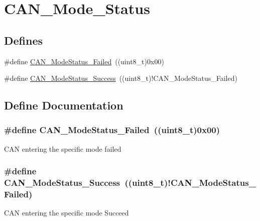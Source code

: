 \hypertarget{group__CAN__Mode__Status}{
\section{CAN\_\-Mode\_\-Status}
\label{group__CAN__Mode__Status}
}
\subsection*{Defines}
\begin{DoxyCompactItemize}
\item 
\#define \hyperlink{group__CAN__Mode__Status_ga9882944537945325ef08e1986838ea45}{CAN\_\-ModeStatus\_\-Failed}~((uint8\_\-t)0x00)
\item 
\#define \hyperlink{group__CAN__Mode__Status_ga7ca0ea503eb3b3a7c0abdfad27cb6579}{CAN\_\-ModeStatus\_\-Success}~((uint8\_\-t)!CAN\_\-ModeStatus\_\-Failed)
\end{DoxyCompactItemize}


\subsection{Define Documentation}
\hypertarget{group__CAN__Mode__Status_ga9882944537945325ef08e1986838ea45}{
\subsubsection[{CAN\_\-ModeStatus\_\-Failed}]{\setlength{\rightskip}{0pt plus 5cm}\#define CAN\_\-ModeStatus\_\-Failed~((uint8\_\-t)0x00)}}
\label{group__CAN__Mode__Status_ga9882944537945325ef08e1986838ea45}
CAN entering the specific mode failed \hypertarget{group__CAN__Mode__Status_ga7ca0ea503eb3b3a7c0abdfad27cb6579}{
\subsubsection[{CAN\_\-ModeStatus\_\-Success}]{\setlength{\rightskip}{0pt plus 5cm}\#define CAN\_\-ModeStatus\_\-Success~((uint8\_\-t)!CAN\_\-ModeStatus\_\-Failed)}}
\label{group__CAN__Mode__Status_ga7ca0ea503eb3b3a7c0abdfad27cb6579}
CAN entering the specific mode Succeed 